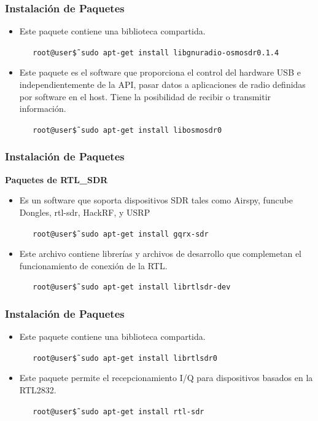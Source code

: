 \begin{frame}
\frametitle{Instalación de Paquetes}

\begin{itemize}
    \item {Este paquete contiene una biblioteca compartida.
    \begin{block}{}
    \texttt
    {\ \ \ root@user\~\$ sudo apt-get install libgnuradio-osmosdr0.1.4}
    \end{block}}
    
    \item{Este paquete es el software que proporciona el control del hardware USB e independientemente de la API, pasar datos a aplicaciones de radio definidas por software en el host. Tiene la posibilidad de recibir o transmitir información.
    \begin{block}{}
    \texttt
    {\ \ \ root@user\~\$ sudo apt-get install libosmosdr0}
    \end{block}}
\end{itemize}

\end{frame}

\begin{frame}
\frametitle{Instalación de Paquetes}
\textbf{Paquetes de RTL\_SDR}
\begin{itemize}
 
    \item { Es un software que soporta dispositivos SDR tales como Airspy, funcube Dongles, rtl-sdr, HackRF, y USRP
    \begin{block}{}
    \texttt
    {\ \ \ root@user\~\$ sudo apt-get install gqrx-sdr}
    \end{block}}
     \item { Este archivo contiene librerías y archivos de desarrollo que complemetan el funcionamiento de conexión de la RTL.
    \begin{block}{}
    \texttt
    {\ \ \ root@user\~\$ sudo apt-get install librtlsdr-dev}
    \end{block}}
\end{itemize}

\end{frame}

\begin{frame}
\frametitle{Instalación de Paquetes}
\begin{itemize}
 
    \item {Este paquete contiene una biblioteca compartida.
    \begin{block}{}
    \texttt
    {\ \ \ root@user\~\$ sudo apt-get install librtlsdr0}
    \end{block}}
    \item {Este paquete permite el recepcionamiento I/Q para dispositivos basados en la RTL2832. 
    \begin{block}{}
    \texttt
    {\ \ \ root@user\~\$ sudo apt-get install rtl-sdr}
    \end{block}}
\end{itemize}

\end{frame}

